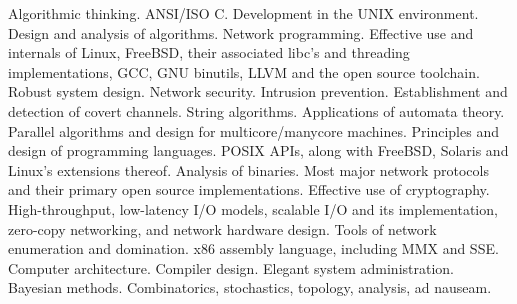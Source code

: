 \documentclass{article}
\begin{document}
Algorithmic thinking. ANSI/ISO C. Development in the UNIX environment. Design
and analysis of algorithms. Network programming. Effective use and internals
of Linux, FreeBSD, their associated libc's and threading implementations,
GCC, GNU binutils, LLVM and the open source toolchain. Robust system design.
Network security. Intrusion prevention. Establishment and detection of covert
channels. String algorithms. Applications of automata theory. Parallel
algorithms and design for multicore/manycore machines. Principles and design
of programming languages. POSIX APIs, along with FreeBSD, Solaris and Linux's
extensions thereof. Analysis of binaries. Most major network protocols and
their primary open source implementations. Effective use of cryptography.
High-throughput, low-latency I/O models, scalable I/O and its implementation,
zero-copy networking, and network hardware design. Tools of network
enumeration and domination. x86 assembly language, including MMX and SSE.
Computer architecture. Compiler design. Elegant system administration.
Bayesian methods. Combinatorics, stochastics, topology, analysis, ad nauseam.
\end{document}
